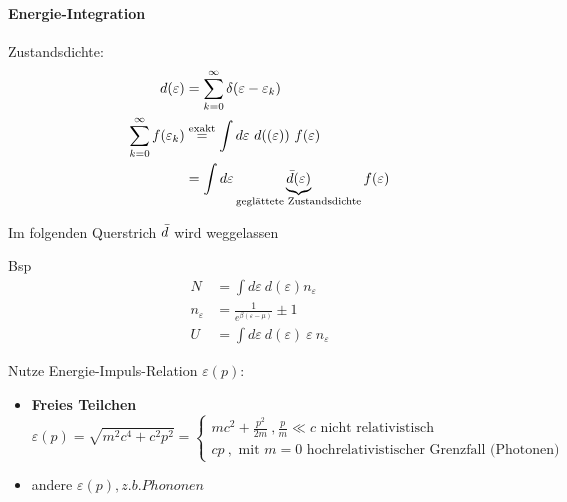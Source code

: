\paragraph{Energie-Integration}
Zustandsdichte:
\begin{align}
    d(\varepsilon) &= \sum_{k=0}^\infty \delta (\varepsilon-\varepsilon_k)\\
    \sum_{k=0}^\infty  f(\varepsilon_k) &\overset{\text{exakt}}{=} \int d\varepsilon \ d((\varepsilon)) \ f(\varepsilon) \\
    &= \int d\varepsilon \underbrace{\Bar{d}(\varepsilon)}_{\text{geglättete Zustandsdichte}} f(\varepsilon)
\end{align}
\begin{center}
\end{center}

Im folgenden Querstrich $\Bar{d}$ wird weggelassen

\begin{beispiel}{Bsp}
    \begin{align}
        N &= \int d\varepsilon \ d(\varepsilon) n_\varepsilon \\
        n_\varepsilon &= \frac{1}{e^{\beta (\varepsilon-\mu)}} \pm 1\\
        U &= \int d\varepsilon \ d(\varepsilon) \ \varepsilon \ n_\varepsilon 
    \end{align}
    
     Nutze Energie-Impuls-Relation $\varepsilon(p)$:

     \begin{itemize}
         \item \textbf{Freies Teilchen} 
         \begin{equation}
             \varepsilon (p) = \sqrt{m^2c^4+ c^2p^2} = \begin{cases}
                 mc^2+\frac{p^2}{2m} \ , \frac{p}{m} \ll c \text{  nicht relativistisch}\\
                 cp \ , \text{ mit } m=0 \text{ hochrelativistischer Grenzfall (Photonen)}
             \end{cases}
         \end{equation}
         \item  andere $\varepsilon(p) , z.b. Phononen$
     \end{itemize}
\end{beispiel}

